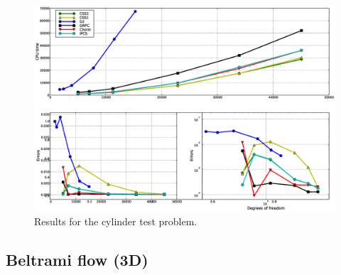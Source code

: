 \begin{figure}
  \begin{center}
    \includegraphics[width=14cm]{chapters/kvs-1/eps/new_cylinder_res.eps}
    \caption{Results for the cylinder test problem.}
    \label{fig:cylinder_res}
  \end{center}
\end{figure}

\subsection{Beltrami flow (3D)}

